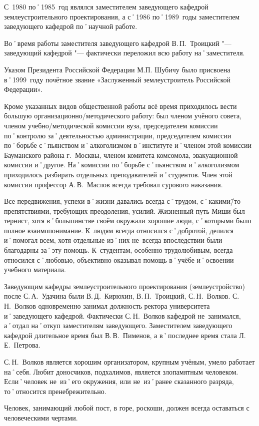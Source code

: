 С~1980 по˚1985~год являлся заместителем заведующего кафедрой землеустроительного проектирования, а с˚1986 по˚1989~годы заместителем заведующего кафедрой по˚научной работе.

Во˚время работы заместителя заведующего кафедрой В.\,П.~Троицкий "--- заведующий кафедрой "--- фактически переложил всю работу на˚заместителя.

Указом Президента Российской Федерации М.П. Шубичу было присвоена в˚1999~году почётное звание «Заслуженный землеустроитель Российской Федерации». 

Кроме указанных видов общественной работы всё время приходилось вести большую организационно\-/методического работу: был членом учёного совета, членом учебно\-/методической комиссии вуза, председателем комиссии по˚контролю за˚деятельностью администрации, председателем комиссии по˚борьбе с˚пьянством и˚алкоголизмом в˚институте и˚членом этой комиссии Бауманского района г.~Москвы, членом комитета комсомола, эвакуационной комиссии и˚другое. На˚комиссии по˚борьбе с˚пьянством и˚алкоголизмом приходилось разбирать отдельных преподавателей и˚студентов. Член этой комиссии профессор А.\,В.~Маслов всегда требовал сурового наказания.

Все передвижения, успехи в˚жизни давались всегда с˚трудом, с˚какими\=/то препятствиями, требующих преодоления, усилий. Жизненный путь Миши был тернист, хотя в˚большинстве своём окружали  хорошие люди, с˚которыми было полное взаимопонимание. К~людям всегда относился с˚добротой, делился и˚помогал всем, хотя отдельные из˚них не~всегда впоследствии были благодарны за˚эту помощь. К~студентам, особенно трудолюбивым, всегда относился с˚любовью, объективно оказывал помощь в˚учёбе и˚освоении учебного материала.



Заведующим кафедры землеустроительного проектирования (землеустройство) после С.\,А.~Удачина были В.\,Д.~Кирюхин, В.\,П.~Троицкий, С.\,Н.~Волков. С.\,Н.~Волков одновременно занимал должность ректора университета и˚заведующего кафедрой. Фактически С.\,Н.~Волков кафедрой не~занимался, а˚отдал на˚откуп заместителям заведующего. Заместителем заведующего кафедрой длительное время был В.\,В.~Пименов, а в˚последнее время стала Л.\,Е.~Петрова. 

С.\,Н.~Волков является хорошим организатором, крупным учёным, умело работает на˚себя. Любит доносчиков, подхалимов, является злопамятным человеком. Если˚человек не~из˚его окружения, или не~из˚ранее сказанного разряда, то˚относится пренебрежительно. 

Человек, занимающий любой пост, в горе, роскоши, должен всегда оставаться с человеческими чертами.